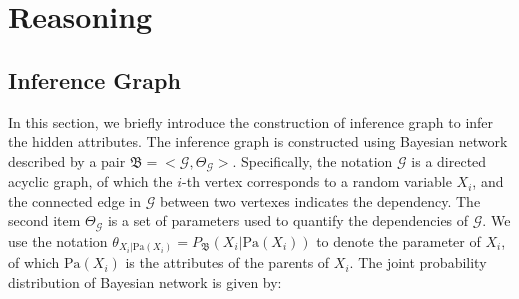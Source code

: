 \section{Reasoning}
\label{sec-reasoning}

\par


\subsection{Inference Graph}
%

In this section, we briefly introduce the construction of inference graph to infer the hidden attributes.  
The inference graph is constructed using Bayesian network described by a pair $\mathfrak{B}=<\mathcal{G},\mathit{\Theta}_\mathcal{G}>$. 
Specifically, the notation $\mathcal{G}$ is a directed acyclic graph, of which the $i$-th vertex corresponds to a random variable $X_i$, and the connected edge in $\mathcal{G}$ between two vertexes indicates the dependency. 
The second item $\mathit{\Theta}_\mathcal{G}$ is a set of parameters used to quantify the dependencies of $\mathcal{G}$.
We use the notation $\theta_{X_i | \text{Pa}(X_i)} = P_\mathfrak{B}(X_i| \text{Pa}{(X_i)})$ to denote the parameter of $X_i$, of which $\text{Pa}(X_i)$ is the attributes of the parents of $X_i$.
The joint probability distribution of Bayesian network is given by:

